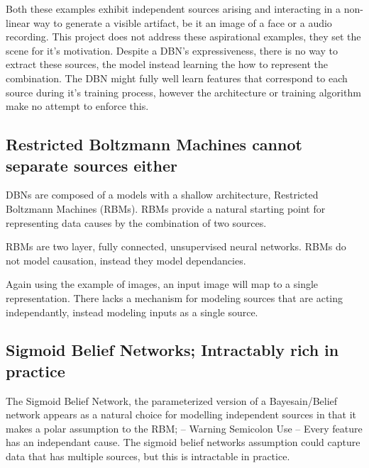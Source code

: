 Both these examples exhibit independent sources arising and interacting in a non-linear way to generate a visible artifact, be it an image of a face or a audio recording. This project does not address these aspirational examples, they set the scene for it's motivation. Despite a DBN's expressiveness, there is no way to extract these sources, the model instead learning the how to represent the combination. The DBN might fully well learn features that correspond to each source during it's training process, however the architecture or training algorithm make no attempt to enforce this.

\subsection{Restricted Boltzmann Machines cannot separate sources either}

DBNs are composed of a models with a shallow architecture, Restricted Boltzmann Machines (RBMs). RBMs provide a natural starting point for representing data causes by the combination of two sources.

RBMs are two layer, fully connected, unsupervised neural networks. RBMs do not model causation, instead they model dependancies.

  Again using the example of images, an input image will map to a single representation. There lacks a mechanism for modeling  sources that are acting independantly, instead modeling inputs as a single source.

\subsection{Sigmoid Belief Networks; Intractably rich in practice}
The Sigmoid Belief Network, the parameterized version of a Bayesain/Belief network appears as a natural choice for modelling independent sources in that it makes a polar assumption to the RBM; -- Warning Semicolon Use -- Every feature has an independant cause. The sigmoid belief networks assumption could capture data that has multiple sources, but this is intractable in practice.

